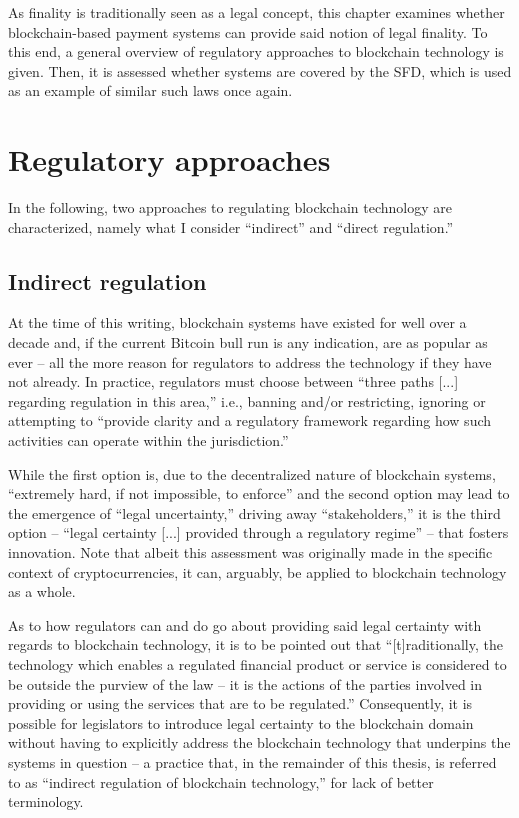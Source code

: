As finality is traditionally seen as a legal concept, this chapter examines whether blockchain-based payment systems can provide said notion of legal finality.
To this end, a general overview of regulatory approaches to blockchain technology is given.
Then, it is assessed whether systems are covered by the SFD, which is used as an example of similar such laws once again.

\section{Regulatory approaches}

In the following, two approaches to regulating blockchain technology are characterized, namely what I consider ``indirect'' and ``direct regulation.''

\subsection{Indirect regulation}

At the time of this writing, blockchain systems have existed for well over a decade and, if the current Bitcoin bull run \autocite{nytimes2021} is any indication, are as popular as ever -- all the more reason for regulators to address the technology if they have not already.
In practice, regulators must choose between ``three paths [...] regarding regulation in this area,'' i.e., banning and/or restricting, ignoring or attempting to ``provide clarity and a regulatory framework regarding how such activities can operate within the jurisdiction.''  \autocite[210]{ellul2020}

While the first option is, due to the decentralized nature of blockchain systems, ``extremely hard, if not impossible, to enforce'' and the second option may lead to the emergence of ``legal uncertainty,'' driving away ``stakeholders,'' it is the third option -- ``legal certainty [...] provided through a regulatory regime'' -- that fosters innovation. \autocite[210]{ellul2020}
Note that albeit this assessment was originally made in the specific context of cryptocurrencies, it can, arguably, be applied to blockchain technology as a whole.

As to how regulators can and do go about providing said legal certainty with regards to blockchain technology, it is to be pointed out that ``[t]raditionally, the technology which enables a regulated financial product or service is considered to be outside the purview of the law -- it is the actions of the parties involved in providing or using the services that are to be regulated.'' \autocite[211]{ellul2020}
Consequently, it is possible for legislators to introduce legal certainty to the blockchain domain without having to explicitly address the blockchain technology that underpins the systems in question -- a practice that, in the remainder of this thesis, is referred to as ``indirect regulation of blockchain technology,'' for lack of better terminology.

